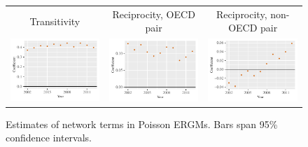 \documentclass[reqno,onecolumn,letterpaper,12pt]{article}
\begin{document}
\begin{figure}[]
\centering
\begin{tabular}{@{\hskip -.05cm}c@{\hskip -.2cm}c@{\hskip -.2cm}c}
Transitivity  & Reciprocity, OECD pair & Reciprocity, non-OECD pair\\
\includegraphics[height=.165\textheight, clip=true, trim=.5cm .5cm 0cm .1cm]{figures/main_rl_plots/Transitivity.pdf}   &
\includegraphics[height=.165\textheight, clip=true, trim=.5cm .5cm 0cm .1cm]{figures/main_rl_plots/Mutuality_OECD.pdf}    &
\includegraphics[height=.165\textheight, clip=true, trim=.5cm .5cm 0cm .1cm]{figures/main_rl_plots/Mutuality_notOECD.pdf} \\
\end{tabular}
\caption{\label{fig:net_effects} Estimates of network terms in Poisson ERGMs. Bars span 95\% confidence intervals.}
\end{figure}
\end{document}

